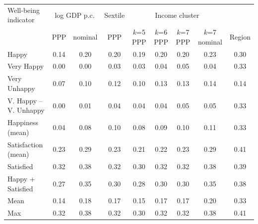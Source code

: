 \begin{tabular}{lcccccccc}
\toprule
Well-being indicator & \multicolumn{2}{c}{log GDP p.c.} & Sextile & \multicolumn{4}{c}{Income cluster} \\ & PPP & nominal & PPP & $k$=5 PPP & $k$=6 PPP & $k$=7 PPP & $k$=7 nominal & Region \\
\midrule
Happy & 0.14 & 0.20 & 0.20 & 0.19 & 0.20 & 0.20 & 0.23 & 0.30 \\
Very Happy & 0.00 & 0.00 & 0.03 & 0.03 & 0.04 & 0.05 & 0.04 & 0.33 \\
Very Unhappy & 0.07 & 0.10 & 0.12 & 0.10 & 0.13 & 0.13 & 0.14 & 0.14 \\
V. Happy -- V. Unhappy & 0.00 & 0.01 & 0.04 & 0.04 & 0.04 & 0.05 & 0.05 & 0.33 \\
Happiness (mean) & 0.04 & 0.08 & 0.10 & 0.08 & 0.09 & 0.10 & 0.11 & 0.33 \\
Satisfaction (mean) & 0.23 & 0.29 & 0.23 & 0.21 & 0.22 & 0.23 & 0.29 & 0.41 \\
Satisfied & 0.32 & 0.38 & 0.32 & 0.30 & 0.32 & 0.32 & 0.38 & 0.39 \\
Happy + Satisfied & 0.27 & 0.35 & 0.30 & 0.28 & 0.30 & 0.30 & 0.35 & 0.38 \\
\midrule
Mean & 0.14 & 0.18 & 0.17 & 0.15 & 0.17 & 0.17 & 0.20 & 0.33 \\
Max & 0.32 & 0.38 & 0.32 & 0.30 & 0.32 & 0.32 & 0.38 & 0.41 \\
\bottomrule
\end{tabular}
